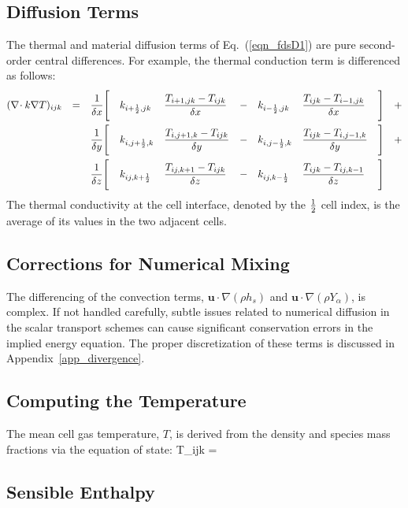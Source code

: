 \subsection{Diffusion Terms}
\label{div_discret}

The thermal and material diffusion terms of Eq.~(\ref{eqn_fdsD1}) are pure second-order central differences. For example, the thermal
conduction term is differenced as follows:
\begin{align}
(\nabla\!\cdot k \nabla T)_{ijk}
            &&=&&& \frac{1}{\delta x} \Bigg[ && k_{i+\frac{1}{2},jk} && \frac{T_{i+1,jk}-T_{ijk}}{\delta x}  &&-&& k_{i-\frac{1}{2},jk}  && \frac{T_{ijk}-T_{i-1,jk}}{\delta x}  &&\Bigg]  &+ \notag \\
            && &&& \frac{1}{\delta y} \Bigg[ && k_{i,j+\frac{1}{2},k}&& \frac{T_{i,j+1,k}-T_{ijk}}{\delta y} &&-&& k_{i,j-\frac{1}{2},k} && \frac{T_{ijk}-T_{i,j-1,k}}{\delta y} &&\Bigg]  &+ \notag \\
            && &&& \frac{1}{\delta z} \Bigg[ && k_{ij,k+\frac{1}{2}} && \frac{T_{ij,k+1}-T_{ijk}}{\delta z}  &&-&& k_{ij,k-\frac{1}{2}}  && \frac{T_{ijk}-T_{ij,k-1}}{\delta z}  &&\Bigg]  &
\end{align}
The thermal conductivity at the cell interface, denoted by the $\frac{1}{2}$ cell index, is the average of its values in the two adjacent cells.

\subsection{Corrections for Numerical Mixing}

The differencing of the convection terms, $\mathbf{u} \cdot\nabla (\rho h_s)$ and $\mathbf{u} \cdot \nabla (\rho Y_\alpha)$, is complex.  If not handled carefully, subtle issues related to numerical diffusion in the scalar transport schemes can cause significant conservation errors in the implied energy equation.  The proper discretization of these terms is discussed in Appendix~\ref{app_divergence}.

\subsection{Computing the Temperature}

The mean cell gas temperature, $T$, is derived from the density and species mass fractions via the equation of state:
\be T_{ijk} = \ee

\subsection{Sensible Enthalpy}

